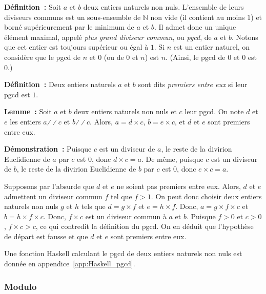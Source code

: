 \bigskip

\noindent\textbf{Définition :} Soit $a$ et $b$ deux entiers naturels non nuls. L'ensemble de leurs diviseurs communs est un sous-ensemble de $\mathbb{N}$ non vide (il contient au moins $1$) et borné supérieurement par le minimum de $a$ et $b$. Il admet donc un unique élément maximal, appelé \textit{plus grand diviseur commun}, ou \textit{pgcd}, de $a$ et $b$. 
    Notons que cet entier est toujours supérieur ou égal à $1$. 
    Si $n$ est un entier naturel, on considère que le pgcd de $n$ et $0$ (ou de $0$ et $n$) est $n$.
    (Ainsi, le pgcd de $0$ et $0$ est $0$.)

\bigskip

\noindent\textbf{Définition :} Deux entiers naturels $a$ et $b$ sont dits \textit{premiers entre eux} si leur pgcd est $1$.

\bigskip

\noindent\textbf{Lemme :} Soit $a$ et $b$ deux entiers naturels non nuls et $c$ leur pgcd.
    On note $d$ et $e$ les entiers $a \mathrel{\divslash\!\divslash} c$ et $b \mathrel{\divslash\!\divslash} c$. 
    Alors, $a = d \times c$, $b = e \times c$, et $d$ et $e$ sont premiers entre eux.

\medskip

\noindent\textbf{Démonstration :} 
    Puisque $c$ est un diviseur de $a$, le reste de la divirion Euclidienne de $a$ par $c$ est $0$, donc $d \times c = a$.
    De même, puisque $c$ est un diviseur de $b$, le reste de la divirion Euclidienne de $b$ par $c$ est $0$, donc $e \times c = a$.

    Supposons par l'absurde que $d$ et $e$ ne soient pas premiers entre eux. 
    Alors, $d$ et $e$ admettent un diviseur commun $f$ tel que $f > 1$.
    On peut donc choisir deux entiers naturels non nuls $g$ et $h$ tels que $d = g \times f$ et $e = h \times f$.
    Donc, $a = g \times f \times c$ et $b = h \times f \times c$. 
    Donc, $f \times c$ est un diviseur commun à $a$ et $b$. 
    Puisque $f > 0$ et $c > 0$, $f \times c > c$, ce qui contredit la définition du pgcd. 
    On en déduit que l'hypothèse de départ est fausse et que $d$ et $e$ sont premiers entre eux. 

   \done 

\bigskip

Une fonction Haskell calculant le pgcd de deux entiers naturels non nuls est donnée en appendice~\ref{app:Haskell_pgcd}. 

\subsubsection{Modulo}

